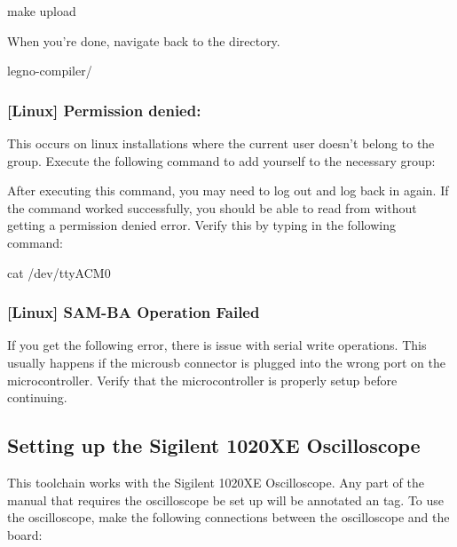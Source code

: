 \begin{snippet}
  make upload
\end{snippet}

When you're done, navigate back to the  directory.

\begin{snippet}
  legno-compiler/
\end{snippet}


\subsubsection{[Linux] Permission denied: }

This occurs on linux installations where the current user doesn't belong to the
 group. Execute the following command to add yourself to the
necessary group:


After executing this command, you may need to log out and log back in again. If
the command worked successfully, you should be able to read from
 without getting a permission denied error. Verify this by
typing in the following command:

\begin{snippet}
cat /dev/ttyACM0
\end{snippet}

\subsubsection{[Linux] SAM-BA Operation Failed}

If you get the following error, there is issue with serial write operations.
This usually happens if the microusb connector is plugged into the wrong port
on the microcontroller. Verify that the microcontroller is properly setup
before continuing.

\subsection{Setting up the Sigilent 1020XE Oscilloscope}
\label{sec:setup-osc}

This toolchain works with the Sigilent 1020XE Oscilloscope. Any part of the
manual that requires the oscilloscope be set up will be annotated 
an \tx{[OSC]} tag. To use the oscilloscope, make the following connections
between the oscilloscope and the board:

